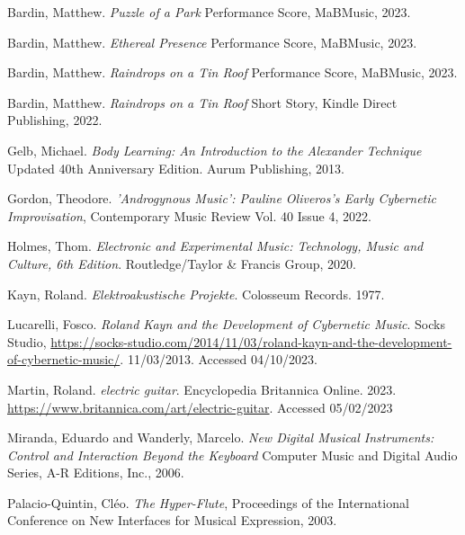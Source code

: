 \begin{thebibliography}{99} %


 Bardin, Matthew. \emph{Puzzle of a Park} Performance Score, MaBMusic, 2023.

 Bardin, Matthew. \emph{Ethereal Presence} Performance Score, MaBMusic, 2023.

 Bardin, Matthew. \emph{Raindrops on a Tin Roof} Performance Score, MaBMusic, 2023.

 Bardin, Matthew. \emph{Raindrops on a Tin Roof} Short Story, Kindle Direct Publishing, 2022.

 Gelb, Michael. \emph{Body Learning: An Introduction to the Alexander Technique} Updated 40th Anniversary Edition. Aurum Publishing, 2013.

 Gordon, Theodore. \emph{'Androgynous Music': Pauline Oliveros's Early Cybernetic Improvisation}, Contemporary Music Review Vol. 40 Issue 4, 2022.

 Holmes, Thom. \emph{Electronic and Experimental Music: Technology, Music and Culture, 6th Edition}. Routledge/Taylor \& Francis Group, 2020.

 Kayn, Roland. \emph{Elektroakustische Projekte}. Colosseum Records. 1977.

 Lucarelli, Fosco. \emph{Roland Kayn and the Development of Cybernetic Music}. Socks Studio, \url{https://socks-studio.com/2014/11/03/roland-kayn-and-the-development-of-cybernetic-music/}. 11/03/2013. Accessed 04/10/2023.

 Martin, Roland. \emph{electric guitar}. Encyclopedia Britannica Online. 2023. \url{https://www.britannica.com/art/electric-guitar}. Accessed 05/02/2023

 Miranda, Eduardo and Wanderly, Marcelo. \emph{New Digital Musical Instruments: Control and Interaction Beyond the Keyboard} Computer Music and Digital Audio Series, A-R Editions, Inc., 2006.

 Palacio-Quintin, Cléo. \emph{The Hyper-Flute}, Proceedings of the International Conference on New Interfaces for Musical Expression, 2003.


\end{thebibliography}
